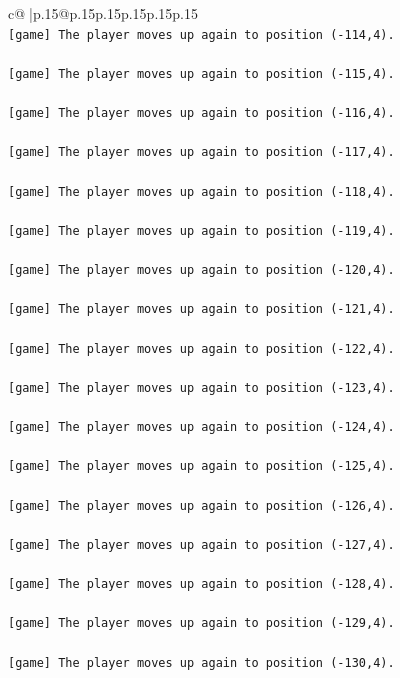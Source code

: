 \documentclass{article}
\begin{document}
{\begin{supertabular}{c@{$\;$}|p{.15\linewidth}@{}p{.15\linewidth}p{.15\linewidth}p{.15\linewidth}p{.15\linewidth}p{.15\linewidth}}
{{{\\ 
\texttt{{[}game{]} The player moves up again to position ({-}114,4).} \\
\\ 
\texttt{{[}game{]} The player moves up again to position ({-}115,4).} \\
\\ 
\texttt{{[}game{]} The player moves up again to position ({-}116,4).} \\
\\ 
\texttt{{[}game{]} The player moves up again to position ({-}117,4).} \\
\\ 
\texttt{{[}game{]} The player moves up again to position ({-}118,4).} \\
\\ 
\texttt{{[}game{]} The player moves up again to position ({-}119,4).} \\
\\ 
\texttt{{[}game{]} The player moves up again to position ({-}120,4).} \\
\\ 
\texttt{{[}game{]} The player moves up again to position ({-}121,4).} \\
\\ 
\texttt{{[}game{]} The player moves up again to position ({-}122,4).} \\
\\ 
\texttt{{[}game{]} The player moves up again to position ({-}123,4).} \\
\\ 
\texttt{{[}game{]} The player moves up again to position ({-}124,4).} \\
\\ 
\texttt{{[}game{]} The player moves up again to position ({-}125,4).} \\
\\ 
\texttt{{[}game{]} The player moves up again to position ({-}126,4).} \\
\\ 
\texttt{{[}game{]} The player moves up again to position ({-}127,4).} \\
\\ 
\texttt{{[}game{]} The player moves up again to position ({-}128,4).} \\
\\ 
\texttt{{[}game{]} The player moves up again to position ({-}129,4).} \\
\\ 
\texttt{{[}game{]} The player moves up again to position ({-}130,4).} \\
}}}
\end{supertabular}}
\end{document}
